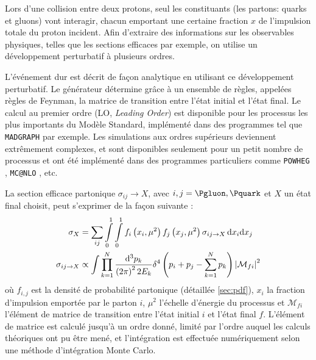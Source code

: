 Lors d'une collision entre deux protons, seul les constituants (les partons: quarks et gluons) vont interagir, chacun emportant une certaine fraction $x$ de l'impulsion totale du proton incident. Afin d'extraire des informations sur les observables physiques, telles que les sections efficaces par exemple, on utilise un développement perturbatif à plusieurs ordres.

L'événement dur est décrit de façon analytique en utilisant ce développement perturbatif. Le générateur détermine grâce à un ensemble de règles, appelées règles de Feynman, la matrice de transition entre l'état initial et l'état final. Le calcul au premier ordre (LO, \emph{Leading Order}) est disponible pour les processus les plus importants du Modèle Standard, implémenté dans des programmes tel que \texttt{MADGRAPH} \citep{madgraph} par exemple. Les simulations aux ordres supérieurs deviennent extrêmement complexes, et sont disponibles seulement pour un petit nombre de processus et ont été implémenté dans des programmes particuliers comme \texttt{POWHEG} \citep{Alioli:2010xd}, \texttt{MC@NLO} \citep{1126-6708-2002-06-029}, etc.

La section efficace partonique $\sigma_{ij} \rightarrow X$, avec $i, j = \Pgluon, \Pquark$ et $X$ un état final choisit, peut s'exprimer de la façon suivante :
\begin{align}
  \sigma_{X} &= \sum_{ij} \int \displaylimits_0^1 \int \displaylimits_0^1 f_i\left( x_i, \mu^2 \right) f_j\left(x_j, \mu^2\right) \sigma_{ij \rightarrow X}\, \mathrm{d}x_i \mathrm{d}x_j \notag \\
  \sigma_{ij \rightarrow X} &\propto \int \prod \displaylimits_{k = 1}^{N} \frac{\mathrm{d}^3p_k}{\left( 2 \pi \right)^2 2 E_k} \delta^4\left( p_i + p_j - \sum_{k = 1}^{N} p_k \right) \left| \mathcal{M}_{fi} \right|^2 \label{eq:section_efficace}
\end{align}
où $f_{i, j}$ est la densité de probabilité partonique (détaillée \cref{sec:pdf}), $x_i$ la fraction d'impulsion emportée par le parton $i$, $\mu^2$ l'échelle d'énergie du processus et $\mathcal{M}_{fi}$ l'élément de matrice de transition entre l'état initial $i$ et l'état final $f$. L'élément de matrice est calculé jusqu'à un ordre donné, limité par l'ordre auquel les calculs théoriques ont pu être mené, et l'intégration est effectuée numériquement selon une méthode d'intégration Monte Carlo.


